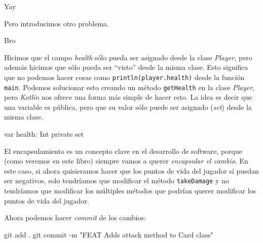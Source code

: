   \begin{center}
    Yay
  \end{center}

  Pero introducimos otro problema.

  \begin{center}
    Bro
  \end{center}

  Hicimos que el campo \textit{health} sólo pueda ser asignado desde la clase 
  \textit{Player}, pero además hicimos que sólo pueda ser \enquote{visto} desde la misma clase.
  Esto significa que no podemos hacer cosas como \texttt{println(player.health)} desde la función
  \texttt{main}.
  Podemos solucionar esto creando un método \texttt{getHealth} en la clase \textit{Player},
  pero \textit{Kotlin} nos ofrece una forma más simple de hacer esto.
  La idea es decir que una variable es pública, pero que su valor sólo puede ser asignado 
  (\textit{set}) desde la misma clase.

  \begin{kotlin}
    var health: Int private set
  \end{kotlin}

  El encapsulamiento es un concepto clave en el desarrollo de software, porque (como veremos en este 
  libro) siempre vamos a querer \textit{encapsular el cambio}.
  En este caso, si ahora quisieramos hacer que los puntos de vida del jugador sí puedan ser 
  negativos, solo tendríamos que modificar el método \texttt{takeDamage} y no tendríamos que
  modificar los múltiples métodos que podrían querer modificar los puntos de vida del jugador.
  
  Ahora podemos hacer \textit{commit} de los cambios:
  
  \begin{kotlin}
    git add .
    git commit -m "FEAT Adds attack method to Card class"
  \end{kotlin}